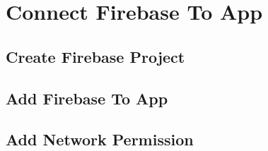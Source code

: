 \chapter{Connect Firebase To App}
\section{Create Firebase Project}
\section{Add Firebase To App}
\section{Add Network Permission}